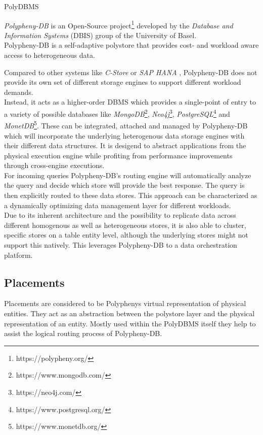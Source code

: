 PolyDBMS \cite{polypheny2021}

\textit{Polypheny-DB} is an Open-Source project\footnote{https://polypheny.org/} developed by 
the \textit{Database and Information Systems} (DBIS) group of the University of Basel.\\

Polypheny-DB is a self-adaptive polystore that provides cost- and workload aware access to heterogeneous data\cite{poly2020}.

Compared to other systems like \textit{C-Store}\cite{cstore_2005} or \textit{SAP HANA} \cite{hana_2012}, 
Polypheny-DB does not provide its own set of different storage engines to support 
different workload demands.\\
Instead, it acts as a higher-order DBMS which provides a single-point of entry to 
a variety of possible databases like 
\textit{MongoDB}\footnote{https://www.mongodb.com/}, 
\textit{Neo4j}\footnote{https://neo4j.com/},
\textit{PostgreSQL}\footnote{https://www.postgresql.org/} 
and \textit{MonetDB}\footnote{https://www.monetdb.org/}. 
These can be integrated, attached and managed by Polypheny-DB which will incorporate the underlying 
heterogenous data storage engines with their different data structures. 
It is desigend to abstract applications from the physical execution engine while profiting from 
performance improvements through cross-engine executions. 
\\
For incoming queries Polypheny-DB's routing engine will automatically analyze the query and decide 
which store will provide the best response. The query is then explicitly routed to these data stores. 
This approach can be characterized as a dynamically optimizing data management layer for different workloads.\\
Due to its inherent architecture and the possibility to replicate data across different homogenous as well as heterogeneous stores, it is also able to cluster, specific stores 
on a table entity level, although the underlying stores might not support this natively. 
This leverages Polypheny-DB to a data orchestration platform. 





\subsection{Placements}
Placements are considered to be Polyphenys virtual representation of physical entities.
They act as an abstraction between the polystore layer and the physical representation of an entity. 
Mostly used within the PolyDBMS itself they help to assist the logical routing process of Polypheny-DB.


